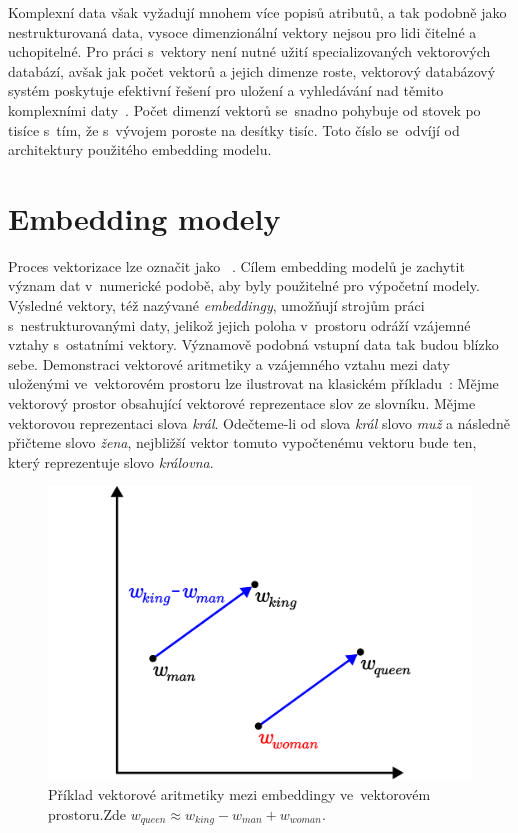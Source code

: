 Komplexní data však vyžadují mnohem více popisů atributů, a tak podobně jako nestrukturovaná data, vysoce dimenzionální vektory nejsou pro lidi čitelné a uchopitelné. Pro práci s~vektory není nutné užití specializovaných vektorových databází, avšak jak počet vektorů a jejich dimenze roste, vektorový databázový systém poskytuje efektivní řešení pro uložení a vyhledávání nad těmito komplexními daty~\cite{Taipalus_2024}. Počet dimenzí vektorů se~snadno pohybuje od stovek po tisíce s~tím, že s~vývojem poroste na desítky tisíc. Toto číslo se~odvíjí od architektury použitého embedding modelu.

\section{Embedding modely}
Proces vektorizace lze označit jako ~\cite{Taipalus_2024}. Cílem embedding modelů je zachytit význam dat v~numerické podobě, aby byly použitelné pro výpočetní modely. Výsledné vektory, též nazývané \textit{embeddingy}, umožňují strojům práci s~nestrukturovanými daty, jelikož jejich poloha v~prostoru odráží vzájemné vztahy s~ostatními vektory. Významově podobná vstupní data tak budou blízko sebe. Demonstraci vektorové aritmetiky a vzájemného vztahu mezi daty uloženými ve~vektorovém prostoru lze ilustrovat na klasickém příkladu~\cite{analogies}: Mějme vektorový prostor obsahující vektorové reprezentace slov ze slovníku. Mějme vektorovou reprezentaci slova \textit{král}. Odečteme-li od slova \textit{král} slovo \textit{muž} a následně přičteme slovo \textit{žena}, nejbližší vektor tomuto vypočtenému vektoru bude ten, který reprezentuje slovo \textit{královna}.

\begin{figure}[H]
    \centering
    \includegraphics[width=0.5\linewidth]{obrazky/kingqueen.pdf}
    \caption{Příklad vektorové aritmetiky mezi embeddingy ve~vektorovém prostoru.\newline Zde $w_{queen} \approx w_{king} - w_{man} + w_{woman}$.}
    \label{fig:vector2D}
\end{figure}

